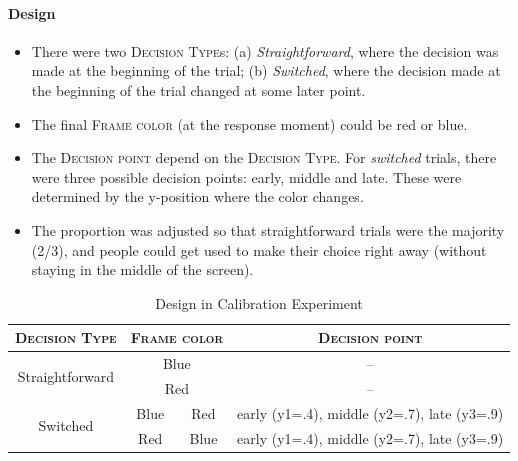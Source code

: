 \documentclass{article}
\begin{document}
\paragraph{Design}

\begin{itemize}

\item There were two \textsc{Decision Type}s: (a) \textit{Straightforward}, where the decision was made at the beginning of the trial; (b) \textit{Switched}, where the decision made at the beginning of the trial changed at some later point. 

\item The final \textsc{Frame color} (at the response moment) could be red or blue. 
\item The \textsc{Decision point} depend on the \textsc{Decision Type}. For \textit{switched} trials, there were three possible decision points: early, middle and late. These were determined by the y-position where the color changes. 
\item The proportion was adjusted so that straightforward trials were the majority  (2/3), and people could get used to make their choice right away (without staying in the middle of the screen).
\end{itemize}

\begin{table}[!h]
\centering
\begin{tabular}{cccc}
\textsc{Decision Type}&\multicolumn{2}{c}{\textsc{Frame color}}&\textsc{Decision point}\\
\hline
\multirow{2}{*}{Straightforward} & \multicolumn{2}{c}{\cellcolor{blue} Blue} & -- \\
& \multicolumn{2}{c}{\cellcolor{red} Red} & -- \\
\hline
\multirow{2}{*}{Switched} & \cellcolor{blue}Blue & \cellcolor{red} Red & early (y1=.4), middle (y2=.7), late (y3=.9) \\
 & \cellcolor{red} Red & \cellcolor{blue} Blue & early (y1=.4), middle (y2=.7), late (y3=.9) \\
\hline
\end{tabular}
\caption{Design in Calibration Experiment}
\end{table}
\end{document}
